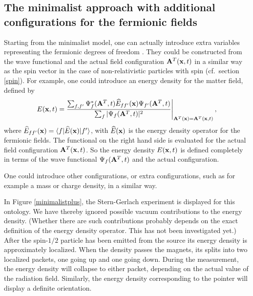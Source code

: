 \documentclass[12pt]{article}
\begin{document}
\subsection{The minimalist approach with additional configurations for the fermionic fields}
Starting from the minimalist model, one can actually introduce extra variables representing the fermionic degrees of freedom \cite{struyve07b}. They could be constructed from the wave functional and the actual field configuration ${\bf A}^T ({\bf x},t)$ in a similar way as the spin vector in the case of non-relativistic particles with spin (cf.\ section \ref{spin}). For example, one could introduce an energy density for the matter field, defined by 
\begin{equation}
E({\bf x},t) =  \frac{\sum_{f,f'} \Psi^*_f({\bf A}^T,t) {\widehat E}_{ff'} ({\bf x}) \Psi_{f'}({\bf A}^T,t)  }{\sum_f |\Psi_f({\bf A}^T,t)|^2}\Bigg|_{{\bf A}^T({\bf x}) = {\bf A}^T ({\bf x},t)} \,,
\label{8}
\end{equation}
where ${\widehat E}_{ff'}({\bf x}) = \langle f | {\widehat E}({\bf x}) |f'\rangle$, with ${\widehat E}({\bf x})$ is the energy density operator for the fermionic fields. The functional on the right hand side is evaluated for the actual field configuration ${\bf A}^T ({\bf x},t)$. So the energy density $E({\bf x},t)$ is defined completely in terms of the wave functional $\Psi_f({\bf A}^T,t)$ and the actual configuration. 

One could introduce other configurations, or extra configurations, such as for example a mass or charge density, in a similar way.
 
In Figure \ref{minimalistplus}, the Stern-Gerlach experiment is displayed for this ontology. We have thereby ignored possible vacuum contributions to the energy density. (Whether there are such contributions probably depends on the exact definition of the energy density operator. This has not been investigated yet.) After the spin-$1/2$ particle has been emitted from the source its energy density is approximately localized. When the density passes the magnets, its splits into two localized packets, one going up and one going down. During the measurement, the energy density will collapse to either packet, depending on the actual value of the radiation field. Similarly, the energy density corresponding to the pointer will display a definite orientation.
\end{document}
